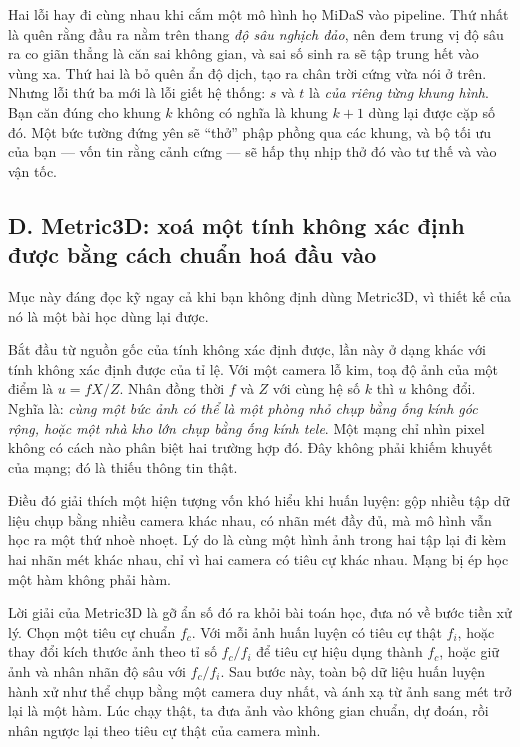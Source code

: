 \documentclass[../../deep_learning.tex]{subfiles}
\begin{document}
\begin{cambay}
Hai lỗi hay đi cùng nhau khi cắm một mô hình họ MiDaS vào pipeline. Thứ nhất là quên rằng đầu ra nằm trên thang \emph{độ sâu nghịch đảo}, nên đem trung vị độ sâu ra co giãn thẳng là căn sai không gian, và sai số sinh ra sẽ tập trung hết vào vùng xa. Thứ hai là bỏ quên ẩn độ dịch, tạo ra chân trời cứng vừa nói ở trên. Nhưng lỗi thứ ba mới là lỗi giết hệ thống: \(s\) và \(t\) là \emph{của riêng từng khung hình}. Bạn căn đúng cho khung \(k\) không có nghĩa là khung \(k+1\) dùng lại được cặp số đó. Một bức tường đứng yên sẽ ``thở'' phập phồng qua các khung, và bộ tối ưu của bạn --- vốn tin rằng cảnh cứng --- sẽ hấp thụ nhịp thở đó vào tư thế và vào vận tốc.
\end{cambay}

\subsection{D. Metric3D: xoá một tính không xác định được bằng cách chuẩn hoá đầu vào}
Mục này đáng đọc kỹ ngay cả khi bạn không định dùng Metric3D, vì thiết kế của nó là một bài học dùng lại được.

Bắt đầu từ nguồn gốc của tính không xác định được, lần này ở dạng khác với tính không xác định được của tỉ lệ. Với một camera lỗ kim, toạ độ ảnh của một điểm là \(u = f X / Z\). Nhân đồng thời \(f\) và \(Z\) với cùng hệ số \(k\) thì \(u\) không đổi. Nghĩa là: \emph{cùng một bức ảnh có thể là một phòng nhỏ chụp bằng ống kính góc rộng, hoặc một nhà kho lớn chụp bằng ống kính tele}. Một mạng chỉ nhìn pixel không có cách nào phân biệt hai trường hợp đó. Đây không phải khiếm khuyết của mạng; đó là thiếu thông tin thật.

Điều đó giải thích một hiện tượng vốn khó hiểu khi huấn luyện: gộp nhiều tập dữ liệu chụp bằng nhiều camera khác nhau, có nhãn mét đầy đủ, mà mô hình vẫn học ra một thứ nhoè nhoẹt. Lý do là cùng một hình ảnh trong hai tập lại đi kèm hai nhãn mét khác nhau, chỉ vì hai camera có tiêu cự khác nhau. Mạng bị ép học một hàm không phải hàm.

Lời giải của Metric3D là gỡ ẩn số đó ra khỏi bài toán học, đưa nó về bước tiền xử lý. Chọn một tiêu cự chuẩn \(f_c\). Với mỗi ảnh huấn luyện có tiêu cự thật \(f_i\), hoặc thay đổi kích thước ảnh theo tỉ số \(f_c/f_i\) để tiêu cự hiệu dụng thành \(f_c\), hoặc giữ ảnh và nhân nhãn độ sâu với \(f_c/f_i\). Sau bước này, toàn bộ dữ liệu huấn luyện hành xử như thể chụp bằng một camera duy nhất, và ánh xạ từ ảnh sang mét trở lại là một hàm. Lúc chạy thật, ta đưa ảnh vào không gian chuẩn, dự đoán, rồi nhân ngược lại theo tiêu cự thật của camera mình.
\end{document}
